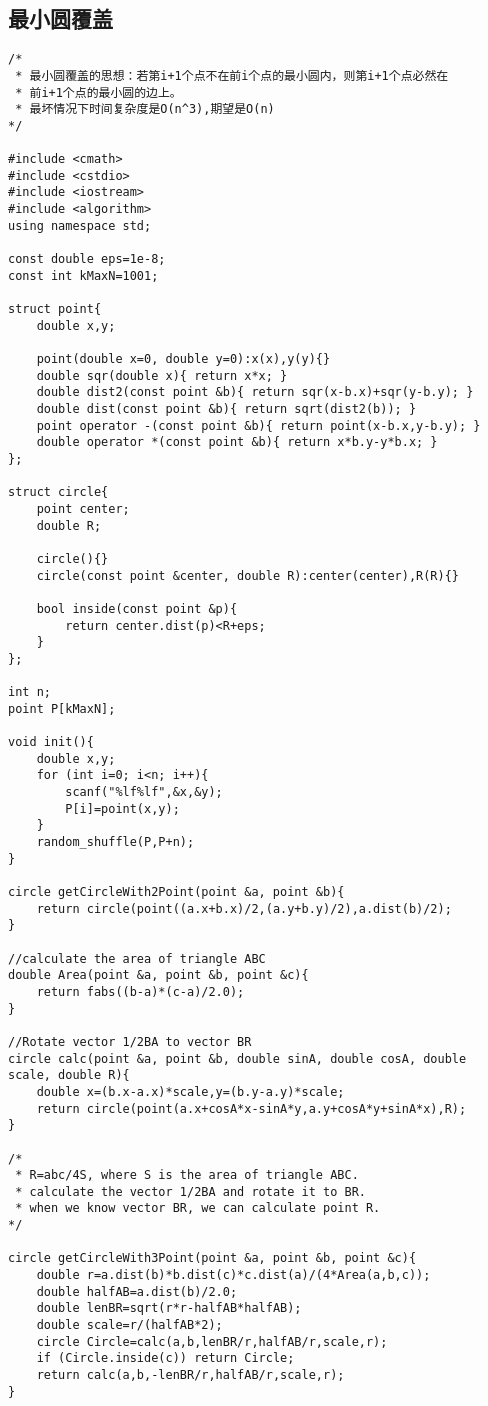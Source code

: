 \subsection{最小圆覆盖}
\begin{verbatim}
/*
 * 最小圆覆盖的思想：若第i+1个点不在前i个点的最小圆内，则第i+1个点必然在
 * 前i+1个点的最小圆的边上。
 * 最坏情况下时间复杂度是O(n^3),期望是O(n)
*/

#include <cmath>
#include <cstdio>
#include <iostream>
#include <algorithm>
using namespace std;

const double eps=1e-8;
const int kMaxN=1001;

struct point{
    double x,y;

    point(double x=0, double y=0):x(x),y(y){}
    double sqr(double x){ return x*x; }
    double dist2(const point &b){ return sqr(x-b.x)+sqr(y-b.y); }
    double dist(const point &b){ return sqrt(dist2(b)); }
    point operator -(const point &b){ return point(x-b.x,y-b.y); }
    double operator *(const point &b){ return x*b.y-y*b.x; }
};

struct circle{
    point center;
    double R;

    circle(){}
    circle(const point &center, double R):center(center),R(R){}

    bool inside(const point &p){
        return center.dist(p)<R+eps;
    }
};

int n;
point P[kMaxN];

void init(){
    double x,y;
    for (int i=0; i<n; i++){
        scanf("%lf%lf",&x,&y);
        P[i]=point(x,y);
    }
    random_shuffle(P,P+n);
}

circle getCircleWith2Point(point &a, point &b){
    return circle(point((a.x+b.x)/2,(a.y+b.y)/2),a.dist(b)/2);
}

//calculate the area of triangle ABC
double Area(point &a, point &b, point &c){
    return fabs((b-a)*(c-a)/2.0);
}

//Rotate vector 1/2BA to vector BR
circle calc(point &a, point &b, double sinA, double cosA, double scale, double R){
    double x=(b.x-a.x)*scale,y=(b.y-a.y)*scale;
    return circle(point(a.x+cosA*x-sinA*y,a.y+cosA*y+sinA*x),R);
}

/*
 * R=abc/4S, where S is the area of triangle ABC.
 * calculate the vector 1/2BA and rotate it to BR.
 * when we know vector BR, we can calculate point R.
*/

circle getCircleWith3Point(point &a, point &b, point &c){
    double r=a.dist(b)*b.dist(c)*c.dist(a)/(4*Area(a,b,c));
    double halfAB=a.dist(b)/2.0;
    double lenBR=sqrt(r*r-halfAB*halfAB);
    double scale=r/(halfAB*2);
    circle Circle=calc(a,b,lenBR/r,halfAB/r,scale,r);
    if (Circle.inside(c)) return Circle;
    return calc(a,b,-lenBR/r,halfAB/r,scale,r);
}


\end{verbatim}
